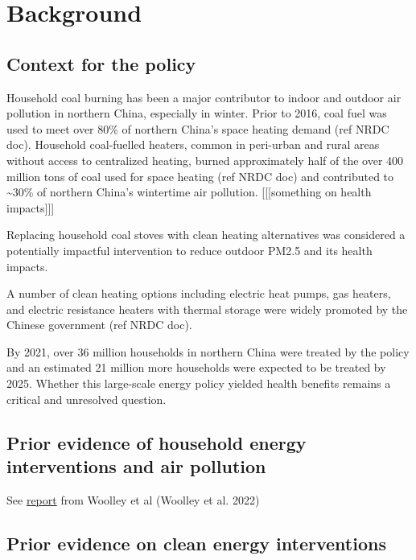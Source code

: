 \documentclass[
  letterpaper,
  DIV=11,
  numbers=noendperiod]{scrartcl}
\begin{document}
\section{Background}\label{background}

\subsection{Context for the policy}\label{context-for-the-policy}

Household coal burning has been a major contributor to indoor and
outdoor air pollution in northern China, especially in winter. Prior to
2016, coal fuel was used to meet over 80\% of northern China's space
heating demand (ref NRDC doc). Household coal-fuelled heaters, common in
peri-urban and rural areas without access to centralized heating, burned
approximately half of the over 400 million tons of coal used for space
heating (ref NRDC doc) and contributed to \textasciitilde30\% of
northern China's wintertime air pollution. {[}{[}{[}something on health
impacts{]}{]}{]}

Replacing household coal stoves with clean heating alternatives was
considered a potentially impactful intervention to reduce outdoor PM2.5
and its health impacts.

A number of clean heating options including electric heat pumps, gas
heaters, and electric resistance heaters with thermal storage were
widely promoted by the Chinese government (ref NRDC doc).

By 2021, over 36 million households in northern China were treated by
the policy and an estimated 21 million more households were expected to
be treated by 2025. Whether this large-scale energy policy yielded
health benefits remains a critical and unresolved question.

\subsection{Prior evidence of household energy interventions and air
pollution}\label{prior-evidence-of-household-energy-interventions-and-air-pollution}

See
\href{https://onlinelibrary.wiley.com/doi/epdf/10.1111/ina.12958}{report}
from Woolley et al (Woolley et al. 2022)

\subsection{Prior evidence on clean energy
interventions}\label{prior-evidence-on-clean-energy-interventions}
\end{document}
